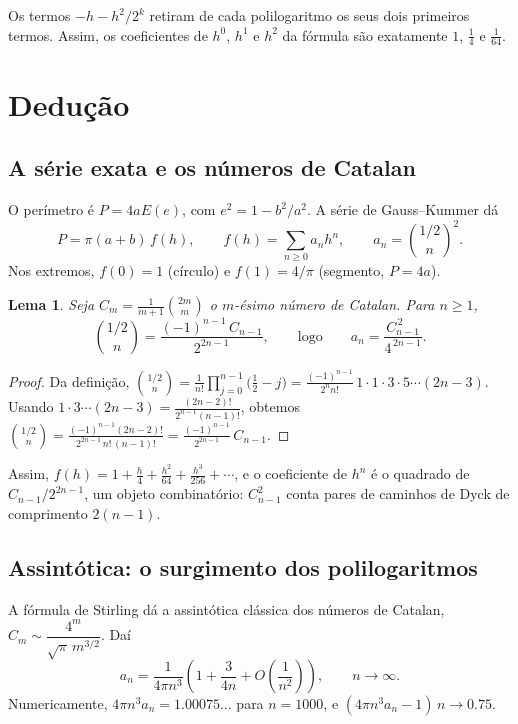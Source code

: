 \documentclass[11pt,a4paper]{article}
\newtheorem{lema}[teorema]{Lema}
\theoremstyle{remark}
\begin{document}
Os termos $-h-h^2/2^k$ retiram de cada polilogaritmo os seus dois primeiros
termos. Assim, os coeficientes de $h^0$, $h^1$ e $h^2$ da fórmula são exatamente
$1$, $\tfrac14$ e $\tfrac1{64}$.

\section{Dedução}

\subsection{A série exata e os números de Catalan}

O perímetro é $P=4aE(e)$, com $e^2=1-b^2/a^2$. A série de Gauss--Kummer dá
\begin{equation}\label{eq:serie}
P=\pi(a+b)\,f(h),\qquad f(h)=\sum_{n\ge0}a_nh^n,\qquad a_n=\binom{1/2}{n}^{\!2}.
\end{equation}
Nos extremos, $f(0)=1$ (círculo) e $f(1)=4/\pi$ (segmento, $P=4a$).

\begin{lema}\label{lema:catalan}
Seja $C_m=\frac{1}{m+1}\binom{2m}{m}$ o $m$-ésimo número de Catalan. Para $n\ge1$,
\[
\binom{1/2}{n}=\frac{(-1)^{n-1}\,C_{n-1}}{2^{2n-1}},
\qquad\text{logo}\qquad
a_n=\frac{C_{n-1}^{\,2}}{4^{\,2n-1}}.
\]
\end{lema}
\begin{proof}
Da definição,
$\binom{1/2}{n}=\frac{1}{n!}\prod_{j=0}^{n-1}\big(\tfrac12-j\big)
=\frac{(-1)^{n-1}}{2^n n!}\,1\cdot1\cdot3\cdot5\cdots(2n-3)$.
Usando $1\cdot3\cdots(2n-3)=\frac{(2n-2)!}{2^{n-1}(n-1)!}$, obtemos
$\binom{1/2}{n}=\frac{(-1)^{n-1}(2n-2)!}{2^{2n-1}\,n!\,(n-1)!}
=\frac{(-1)^{n-1}}{2^{2n-1}}\,C_{n-1}$.
\end{proof}

Assim,
$f(h)=1+\frac{h}{4}+\frac{h^2}{64}+\frac{h^3}{256}+\cdots$, e o
coeficiente de $h^n$ é o quadrado de $C_{n-1}/2^{2n-1}$, um objeto
combinatório: $C_{n-1}^2$ conta pares de caminhos de Dyck de comprimento
$2(n-1)$.

\subsection{Assintótica: o surgimento dos polilogaritmos}

A fórmula de Stirling dá a assintótica clássica dos números de Catalan,
$C_m\sim\dfrac{4^m}{\sqrt\pi\,m^{3/2}}$. Daí
\begin{equation}\label{eq:assint}
a_n=\frac{1}{4\pi n^3}\left(1+\frac{3}{4n}+O\!\left(\frac1{n^2}\right)\right),
\qquad n\to\infty.
\end{equation}
Numericamente, $4\pi n^3a_n=1.00075\ldots$ para $n=1000$, e
$(4\pi n^3a_n-1)\,n\to0.75$.
\end{document}
